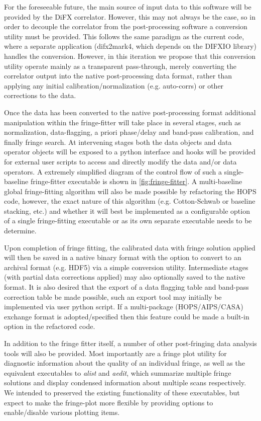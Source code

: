 \documentclass[hidelinks]{article}
\begin{document}
For the foreseeable future, the main source of input data to this software will be provided by the DiFX correlator. However, this may not always
be the case, so in order to decouple the correlator from the post-processing software a conversion utility must be provided. This follows
the same paradigm as the current code, where a separate application (difx2mark4, which depends on the DIFXIO library) handles the conversion. However,
in this iteration we propose that this conversion utility operate mainly as a transparent pass-through, merely
converting the correlator output into the native post-processing data format, rather than applying any initial calibration/normalization (e.g. auto-corrs) or
other corrections to the data.

Once the data has been converted to the native post-processing format additional manipulation within the fringe-fitter will take place in several stages, such as normalization, data-flagging, a priori phase/delay and band-pass calibration, and finally fringe search. At intervening stages
both the data objects and data operator objects will be exposed to a python interface and hooks will be provided for external user scripts to 
access and directly modify the data and/or data operators. A extremely simplified diagram of the control flow of such a single-baseline fringe-fitter executable is shown in \ref{fig:fringe-fitter}. A multi-baseline global fringe-fitting algorithm will also be made possible by refactoring the HOPS code, however, the exact nature of this algorithm (e.g. Cotton-Schwab or baseline stacking, etc.) and whether it will best be implemented as a configurable option of a single fringe-fitting executable or as its own separate executable needs to be determine.

Upon completion of fringe fitting, the calibrated data with fringe solution applied will then be saved in a native binary format with the option to convert to an archival format (e.g. HDF5) via a simple conversion utility. Intermediate stages (with partial data corrections applied) may also optionally saved to the native format. It is also desired that
the export of a data flagging table and band-pass correction table be made possible, such an export tool may initially be implemented via user python script. If a multi-package (HOPS/AIPS/CASA) exchange format is adopted/specified then this feature could be made a built-in option in the refactored code.

In addition to the fringe fitter itself, a number of other post-fringing data analysis tools will also be provided. Most importantly are
a fringe plot utility for diagnostic information about the quality of an individual fringe, as well as the equivalent executables to \textit{alist} and \textit{aedit}, which summarize multiple fringe solutions and display condensed information about multiple scans respectively.
We intended to preserved the existing functionality of these executables, but expect to make the fringe-plot more flexible by providing options
to enable/disable various plotting items.
\end{document}

